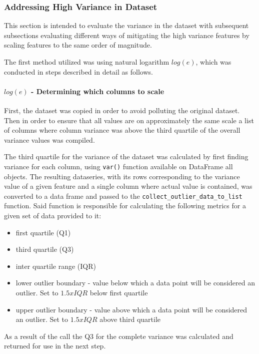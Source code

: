 \subsubsection{Addressing High Variance in Dataset}\label{sec:impl-data-analysis:dealing-with-variance}
This section is intended to evaluate the variance in the dataset with subsequent subsections evaluating different ways of mitigating the high variance features by scaling features to the same order of magnitude.

The first method utilized was using natural logarithm $log(e)$, which was conducted in steps described in detail as follows.
\paragraph{$log(e)$ - Determining which columns to scale}
First, the dataset was copied in order to avoid polluting the original dataset. Then in order to ensure that all values are on approximately the same scale a list of columns where column variance was above the third quartile of the overall variance values was compiled. 

The third quartile for the variance of the dataset was calculated by first finding variance for each column, using \texttt{var()} function available on DataFrame all objects. The resulting dataseries, with its rows corresponding to the variance value of a given feature and a single column where actual value is contained, was converted to a data frame and passed to the \texttt{collect\_outlier\_data\_to\_list} function. Said function is responsible for calculating the following metrics for a given set of data provided to it:
\begin{itemize}
    \item first quartile (Q1)
    \item third quartile (Q3)
    \item inter quartile range (IQR)
    \item lower outlier boundary - value below which a data point will be considered an outlier. Set to $1.5x IQR$ below first quartile
    \item upper outlier boundary - value above which a data point will be considered an outlier. Set to $1.5x IQR$ above third quartile
\end{itemize}

As a result of the call the Q3 for the complete variance was calculated and returned for use in the next step.

